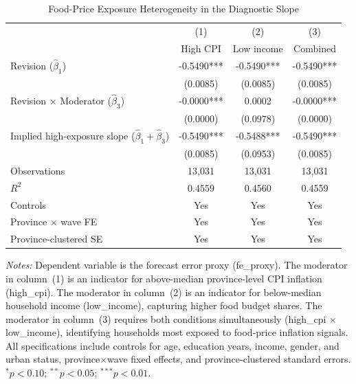 \begin{table}[htbp]
\centering
\caption{Food-Price Exposure Heterogeneity in the Diagnostic Slope}
\label{tab:cfps_food_heterogeneity}
\small
\begin{threeparttable}
\begin{tabular}{lccc}
\toprule
 & (1) & (2) & (3) \\
 & \multicolumn{1}{c}{High CPI} & \multicolumn{1}{c}{Low income} & \multicolumn{1}{c}{Combined} \\
\midrule
\addlinespace
Revision ($\hat{\beta}_1$) & -0.5490*** & -0.5490*** & -0.5490*** \\
 & (0.0085) & (0.0085) & (0.0085) \\
\addlinespace
Revision $\times$ Moderator ($\hat{\beta}_3$) & -0.0000*** & 0.0002 & -0.0000*** \\
 & (0.0000) & (0.0978) & (0.0000) \\
\addlinespace
Implied high-exposure slope ($\hat{\beta}_1 + \hat{\beta}_3$) & -0.5490*** & -0.5488*** & -0.5490*** \\
 & (0.0085) & (0.0953) & (0.0085) \\
\midrule
Observations & 13,031 & 13,031 & 13,031 \\
$R^2$ & 0.4559 & 0.4560 & 0.4559 \\
\addlinespace
Controls & Yes & Yes & Yes \\
Province $\times$ wave FE & Yes & Yes & Yes \\
Province-clustered SE & Yes & Yes & Yes \\
\bottomrule
\end{tabular}
\begin{tablenotes}[flushleft]
\footnotesize
\item \textit{Notes:} Dependent variable is the forecast error proxy (fe\_proxy). The moderator in column~(1) is an indicator for above-median province-level CPI inflation (high\_cpi). The moderator in column~(2) is an indicator for below-median household income (low\_income), capturing higher food budget shares. The moderator in column~(3) requires both conditions simultaneously (high\_cpi $\times$ low\_income), identifying households most exposed to food-price inflation signals. All specifications include controls for age, education years, income, gender, and urban status, province$\times$wave fixed effects, and province-clustered standard errors. $^{*}p<0.10$; $^{**}p<0.05$; $^{***}p<0.01$.
\end{tablenotes}
\end{threeparttable}
\end{table}